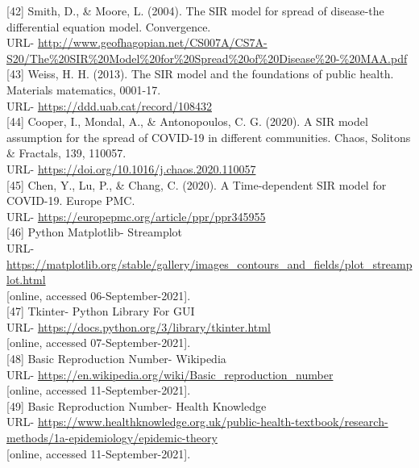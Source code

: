 [42] Smith, D., \& Moore, L. (2004). The SIR model for spread of disease-the differential equation model. Convergence. \\
URL- \url{http://www.geofhagopian.net/CS007A/CS7A-S20/The%20SIR%20Model%20for%20Spread%20of%20Disease%20-%20MAA.pdf} \\

[43] Weiss, H. H. (2013). The SIR model and the foundations of public health. Materials matematics, 0001-17. \\
URL- \url{https://ddd.uab.cat/record/108432} \\

[44] Cooper, I., Mondal, A., \& Antonopoulos, C. G. (2020). A SIR model assumption for the spread of COVID-19 in different communities. Chaos, Solitons \& Fractals, 139, 110057. \\
URL- \url{https://doi.org/10.1016/j.chaos.2020.110057} \\

[45] Chen, Y., Lu, P., \& Chang, C. (2020). A Time-dependent SIR model for COVID-19. Europe PMC. \\
URL- \url{https://europepmc.org/article/ppr/ppr345955} \\

[46] Python Matplotlib- Streamplot \\
URL- \url{https://matplotlib.org/stable/gallery/images_contours_and_fields/plot_streamplot.html} \\
{[online, accessed 06-September-2021]}. \\

[47] Tkinter- Python Library For GUI \\
URL- \url{https://docs.python.org/3/library/tkinter.html} \\
{[online, accessed 07-September-2021]}. \\

[48] Basic Reproduction Number- Wikipedia \\
URL- \url{https://en.wikipedia.org/wiki/Basic_reproduction_number} \\
{[online, accessed 11-September-2021]}. \\

[49] Basic Reproduction Number- Health Knowledge \\
URL- \url{https://www.healthknowledge.org.uk/public-health-textbook/research-methods/1a-epidemiology/epidemic-theory} \\
{[online, accessed 11-September-2021]}. \\

